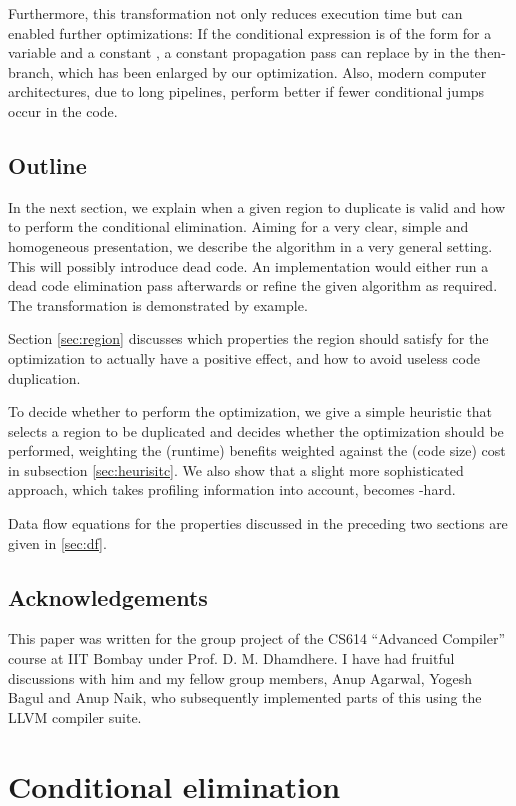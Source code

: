 \documentclass[halfparskip]{scrartcl}
\begin{document}
Furthermore, this transformation not only reduces execution time but can enabled further optimizations: If the conditional expression is of the form  for a variable  and a constant , a constant propagation pass can replace  by  in the then-branch, which has been enlarged by our optimization. Also, modern computer architectures, due to long pipelines, perform better if fewer conditional jumps occur in the code.

\subsection{Outline}

In the next section, we explain when a given region to duplicate is valid and how to perform the conditional elimination. Aiming for a very clear, simple and homogeneous presentation, we describe the algorithm in a very general setting. This will possibly introduce dead code. An implementation would either run a dead code elimination pass afterwards or refine the given algorithm as required. The transformation is demonstrated by example.

Section \ref{sec:region} discusses which properties the region should satisfy for the optimization to actually have a positive effect, and how to avoid useless code duplication.

To decide whether to perform the optimization, we give a simple heuristic that selects a region to be duplicated and decides whether the optimization should be performed, weighting the (runtime) benefits weighted against the (code size) cost in subsection \ref{sec:heurisitc}. We also show that a slight more sophisticated approach, which takes profiling information into account, becomes -hard.

Data flow equations for the properties discussed in the preceding two sections are given in \ref{sec:df}.

\subsection{Acknowledgements}

This paper was written for the group project of the CS614 “Advanced Compiler” course at IIT Bombay under Prof. D. M. Dhamdhere. I have had fruitful discussions with him and my fellow group members, Anup Agarwal, Yogesh Bagul and Anup Naik, who subsequently implemented parts of this using the LLVM compiler suite. 


\section{Conditional elimination}
\end{document}
